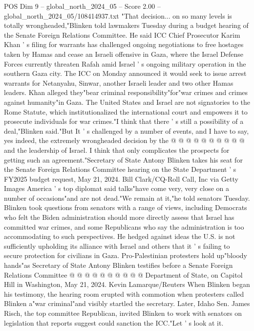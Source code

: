 \begin{textsample}{POS Dim 9 – global\_north\_2024\_05 – Score 2.00 – global\_north\_2024\_05/108414937.txt}  \label{ex:f9_pos_208}
"That decision... on so many levels is totally wrongheaded,"Blinken told lawmakers Tuesday during a budget hearing of the Senate Foreign Relations Committee.
He said ICC Chief Prosecutor Karim Khan ' s filing for warrants has challenged ongoing negotiations to free hostages taken by Hamas and cease an Israeli offensive in Gaza, where the Israel Defense Forces currently threaten Rafah amid Israel ' s ongoing military operation in the southern Gaza city.
The ICC on Monday announced it would seek to issue arrest warrants for Netanyahu, Sinwar, another Israeli leader and two other Hamas leaders.
Khan alleged they"bear criminal responsibility"for"war crimes and crimes against humanity"in Gaza.
The United States and Israel are not signatories to the Rome Statute, which institutionalized the international court and empowers it to prosecute individuals for war crimes."I think that there ' s still a possibility of a deal,"Blinken said."But It ' s challenged by a number of events, and I have to say, yes indeed, the extremely wrongheaded decision by the @ @ @ @ @ @ @ @ @ @ and the leadership of Israel.
I think that only complicates the prospects for getting such an agreement."Secretary of State Antony Blinken takes his seat for the Senate Foreign Relations Committee hearing on the State Department ' s FY2025 budget request, May 21, 2024.
Bill Clark/CQ-Roll Call, Inc via Getty Images America ' s top diplomat said talks"have come very, very close on a number of occasions"and are not dead."We remain at it,"he told senators Tuesday.
Blinken took questions from senators with a range of views, including Democrats who felt the Biden administration should more directly assess that Israel has committed war crimes, and some Republicans who say the administration is too accommodating to such perspectives.
He hedged against ideas the U.S. is not sufficiently upholding its alliance with Israel and others that it ' s failing to secure protection for civilians in Gaza.
Pro-Palestinian protesters hold up"bloody hands"as Secretary of State Antony Blinken testifies before a Senate Foreign Relations Committee @ @ @ @ @ @ @ @ @ @ Department of State, on Capitol Hill in Washington, May 21, 2024.
Kevin Lamarque/Reuters When Blinken began his testimony, the hearing room erupted with commotion when protesters called Blinken a"war criminal"and visibly startled the secretary.
Later, Idaho Sen.
James Risch, the top committee Republican, invited Blinken to work with senators on legislation that reports suggest could sanction the ICC."Let ' s look at it.

\end{textsample}
